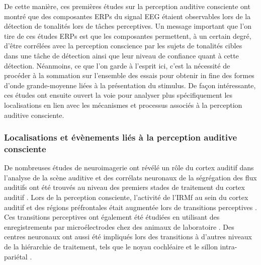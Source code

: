 De cette manière, ces premières études sur la perception auditive consciente ont montré que des composantes ERPs du signal EEG étaient observables lors de la détection de tonalités lors de tâches perceptives. 
Un message important que l'on tire de ces études ERPs est que les composantes permettent, à un certain degré, d'être corrélées avec la perception conscience par les sujets de tonalités cibles dans une tâche de détection ainsi que leur niveau de confiance quant à cette détection. 
Néanmoins, ce que l'on garde à l'esprit ici, c'est la nécessité de procéder à la sommation sur l'ensemble des essais pour obtenir in fine des formes d'onde grande-moyenne liées à la présentation du stimulus. 
De façon intéressante, ces études ont ensuite ouvert la voie pour analyser plus spécifiquement les localisations en lien avec les mécanismes et processus associés à la perception auditive consciente. 

\subsubsection{Localisations et évènements liés à la perception auditive consciente}

De nombreuses études de neuroimagerie ont révélé un rôle du cortex auditif dans l'analyse de la scène auditive \citep{fishman2001neural, gutschalk2005neuromagnetic, micheyl2005perceptual, middlebrooks2013spatial} et des corrélats neuronaux de la ségrégation des flux auditifs ont été trouvés au niveau des premiers stades de traitement du cortex auditif \citep{dykstra2011neural, dykstra2016neural, gutschalk2008neural, konigs2012functional}. 
Lors de la perception consciente, l'activité de l'IRMf au sein du cortex auditif et des régions préfrontales était augmentée lors de transitions perceptives \citep{knapen2011role}. 
Ces transitions perceptives ont également été étudiées en utilisant des enregistrements par microélectrodes chez des animaux de laboratoire \citep{bee2004primitive, bee2010neural, fay1998auditory, fay2000spectral, fishman2001neural, fishman2004auditory, itatani2009auditory, kanwal2003neurodynamics, kashino2012functional, micheyl2005perceptual, pressnitzer2008perceptual, schul2006auditory}. 
Des centres neuronaux ont aussi été impliqués lors des transitions à d'autres niveaux de la hiérarchie de traitement, tels que le noyau cochléaire \citep{pressnitzer2008perceptual} et le sillon intra-pariétal \citep{cusack2005intraparietal, teki2011brain}. 

